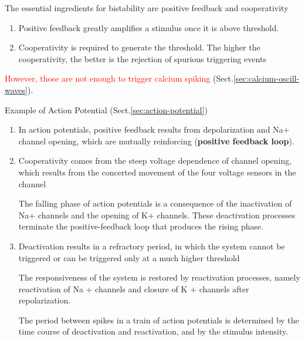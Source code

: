 The essential ingredients for bistability are positive feedback and cooperativity
\begin{enumerate}
  \item Positive feedback greatly amplifies a stimulus once it is above threshold. 
  
  \item Cooperativity is required to generate the threshold. The higher the
  cooperativity, the better is the rejection of spurious triggering events
  
\end{enumerate}
\textcolor{red}{However, those are not enough to trigger calcium spiking}
(Sect.\ref{sec:calcium-oscill-waves}).


Example of Action Potential (Sect.\ref{sec:action-potential})
\begin{enumerate}
  \item  In action potentials, positive feedback results from depolarization and
Na+ channel opening, which are mutually reinforcing ({\bf positive feedback
loop}).

  \item Cooperativity comes from the steep voltage dependence of channel
  opening, which results from the concerted movement of the four voltage sensors
  in the channel
  
The falling phase of action potentials is a consequence of the inactivation
of Na+ channels and the opening of K+ channels.
These deactivation processes terminate the positive-feedback loop that produces
the rising phase.

  \item Deactivation results in a refractory period, in which the system
cannot be triggered or can be triggered only at a much higher threshold

The responsiveness of the system is restored by reactivation processes,
namely reactivation of Na + channels and closure of K + channels after
repolarization. 

The period between spikes in a train of action potentials is
determined by the time course of deactivation and reactivation, and by
the stimulus intensity.
\end{enumerate}

